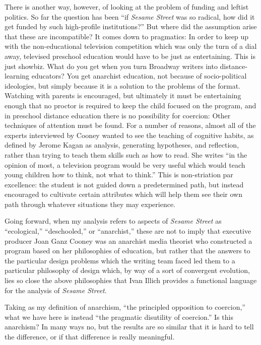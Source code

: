 \documentclass[12pt,letterpaper]{article}
\newcommand{\ses}{\textit{Sesame Street }}
\begin{document}
	There is another 
	way, however, of looking at the problem of funding and leftist politics.
	So far the question has been ``if \ses was so 
	radical, how did it get funded by such high-profile institutions?'' But
	where did the assumption arise that these are incompatible? It comes 
	down to pragmatics: In order to keep up with the non-educational 
	television competition which was only the turn of a dial away, televised
	preschool education would have to be just as 
	entertaining.\autocite[38]{Cooney} This is just showbiz. What do you get
	when you turn Broadway writers into distance-learning educators? You get
	anarchist education, not because of socio-political ideologies, but 
	simply because it is a solution to the problems of the format. Watching 
	with parents is encouraged, but ultimately it must be entertaining 
	enough that no proctor is required to keep the child focused on the 
	program, and in preschool distance education there is no possibility for
	coercion: Other techniques of attention must be found. For a number of 
	reasons, almost all of the experts interviewed by Cooney wanted to see 
	the teaching of cognitive habits, as defined by Jerome Kagan as 
	analysis, generating hypotheses, and reflection, rather than trying to 
	teach them skills such as how to read. She writes 
	``in the opinion of most, a television program would be very useful 
	which would teach young children how to think, not what to 
	think.''\autocite[23]{Cooney} This is non-striation par excellence: the
	student is not guided down a 
	predetermined path, but instead encouraged to cultivate certain 
	attributes which will help them see their own path through whatever 
	situations they may experience.

	Going forward, when my analysis refers to aspects of \ses as 
	``ecological,'' ``deschooled,'' or ``anarchist,'' these are not to imply
	that executive producer Joan Ganz Cooney was an anarchist media theorist
	who 
	constructed a program based on her philosophies of education, but rather 	
  that the answers to the particular design problems which the writing 
	team faced led them to a particular philosophy of design which, by way 	
	of a sort of convergent evolution, lies so close the above philosophies 
	that Ivan Illich provides a functional language for the analysis of 
	\textit{Sesame Street}.

	Taking as my definition of anarchism, ``the principled opposition to 
	coercion,'' what we have here is instead ``the pragmatic disutility of 
	coercion.'' Is this anarchism? In many ways no, but the results 
	are so similar that it is hard to tell the difference, or if that 
	difference is really meaningful.
\end{document}
